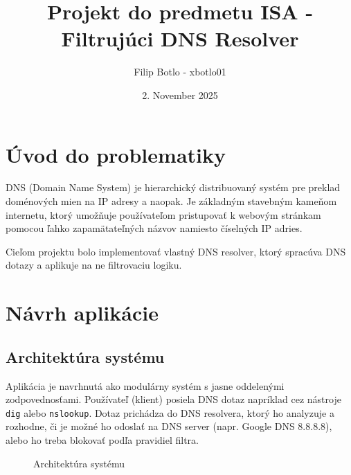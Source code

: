\documentclass[12pt,a4paper]{article}
\title{\textbf{Projekt do predmetu ISA - Filtrujúci DNS Resolver}}
\author{Filip Botlo - xbotlo01}
\date{2. November 2025}
\begin{document}
\maketitle
\tableofcontents
\newpage

\section{Úvod do problematiky}

DNS (Domain Name System) je hierarchický distribuovaný systém pre preklad doménových mien na IP adresy a naopak. Je základným stavebným kameňom internetu, ktorý umožňuje používateľom pristupovať k webovým stránkam pomocou ľahko zapamätateľných názvov namiesto číselných IP adries.

Cieľom projektu bolo implementovať vlastný DNS resolver, ktorý spracúva DNS dotazy a aplikuje na ne filtrovaciu logiku.

\section{Návrh aplikácie}

\subsection{Architektúra systému}

Aplikácia je navrhnutá ako modulárny systém s jasne oddelenými zodpovednosťami. Používateľ (klient) posiela DNS dotaz napríklad cez nástroje \texttt{dig} alebo \texttt{nslookup}. Dotaz prichádza do DNS resolvera, ktorý ho analyzuje a rozhodne, či je možné ho odoslať na DNS server (napr. Google DNS 8.8.8.8), alebo ho treba blokovať podľa pravidiel filtra.

\begin{figure}[h]
\centering
{}
\caption{Architektúra systému}
\end{figure}
\end{document}

